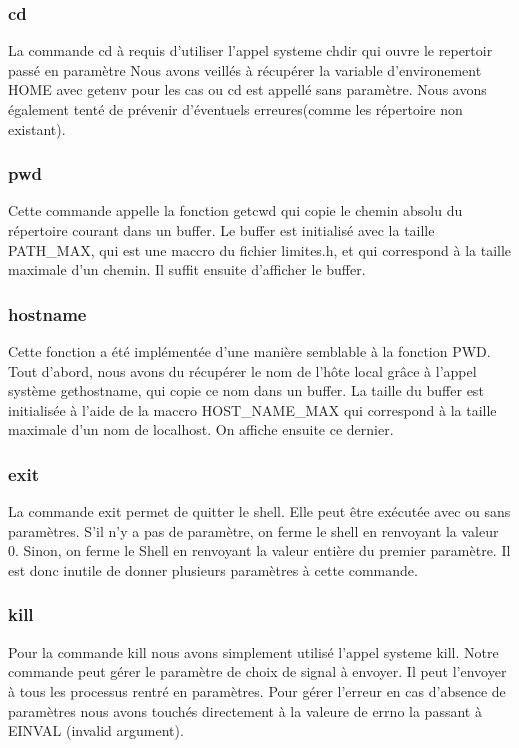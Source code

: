 \documentclass[12pt]{article}
\begin{document}
 \subsubsection{cd}
 La commande cd à requis d'utiliser l'appel systeme chdir qui ouvre le repertoir passé en paramètre
 Nous avons veillés à récupérer la variable d'environement HOME avec getenv pour les cas ou cd est
 appellé sans paramètre. Nous avons également tenté de prévenir d'éventuels erreures(comme les
 répertoire non existant).
 
 \subsubsection{pwd}
 Cette commande appelle la fonction getcwd qui copie le chemin absolu du répertoire courant dans un buffer.  Le buffer est initialisé avec la taille PATH_MAX, qui est une maccro du fichier limites.h, et qui correspond à la taille maximale d'un chemin. Il suffit ensuite d'afficher le buffer.
 
 \subsubsection{hostname}
 Cette fonction a été implémentée d'une manière semblable à la fonction PWD.
Tout d'abord, nous avons du récupérer le nom de l'hôte local grâce à l'appel système gethostname, qui copie ce nom dans un buffer. La taille du buffer est initialisée à l'aide de la maccro HOST_NAME_MAX qui correspond à la taille maximale d'un nom de localhost. On affiche ensuite ce dernier.
 
 \subsubsection{exit}
 La commande exit permet de quitter le shell. Elle peut être exécutée avec ou sans paramètres. S'il n'y a pas de paramètre, on ferme le shell en renvoyant la valeur 0. Sinon, on ferme le Shell en renvoyant la valeur entière du premier paramètre. Il est donc inutile de donner plusieurs paramètres à cette commande.
 
 \subsubsection{kill}
 Pour la commande kill nous avons simplement utilisé l'appel systeme kill. Notre commande
 peut gérer le paramètre de choix de signal à envoyer. Il peut l'envoyer à tous les processus
 rentré en paramètres.
 Pour gérer l'erreur en cas d'absence de paramètres nous avons touchés directement à la valeure
 de errno la passant à EINVAL (invalid argument).
 
\end{document}
